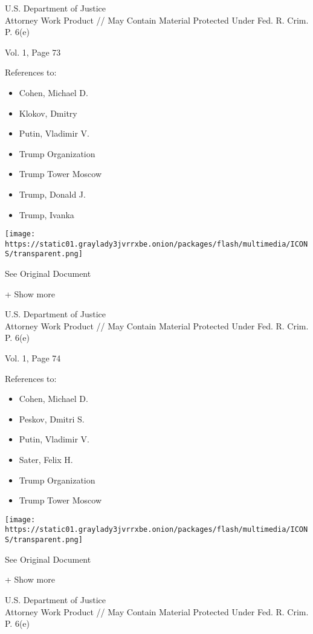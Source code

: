 U.S. Department of Justice\\
Attorney Work Product // May Contain Material Protected Under Fed. R.
Crim. P. 6(e)

Vol. 1, Page 73

References to:

\begin{itemize}
\tightlist
\item
  Cohen, Michael D.
\item
  Klokov, Dmitry
\item
  Putin, Vladimir V.
\item
  Trump Organization
\item
  Trump Tower Moscow
\item
  Trump, Donald J.
\item
  Trump, Ivanka
\end{itemize}

\protect\hyperlink{}{}

\texttt{[image: https://static01.graylady3jvrrxbe.onion/packages/flash/multimedia/ICONS/transparent.png]}

See Original Document

+ Show more

U.S. Department of Justice\\
Attorney Work Product // May Contain Material Protected Under Fed. R.
Crim. P. 6(e)

Vol. 1, Page 74

References to:

\begin{itemize}
\tightlist
\item
  Cohen, Michael D.
\item
  Peskov, Dmitri S.
\item
  Putin, Vladimir V.
\item
  Sater, Felix H.
\item
  Trump Organization
\item
  Trump Tower Moscow
\end{itemize}

\protect\hyperlink{}{}

\texttt{[image: https://static01.graylady3jvrrxbe.onion/packages/flash/multimedia/ICONS/transparent.png]}

See Original Document

+ Show more

U.S. Department of Justice\\
Attorney Work Product // May Contain Material Protected Under Fed. R.
Crim. P. 6(e)

